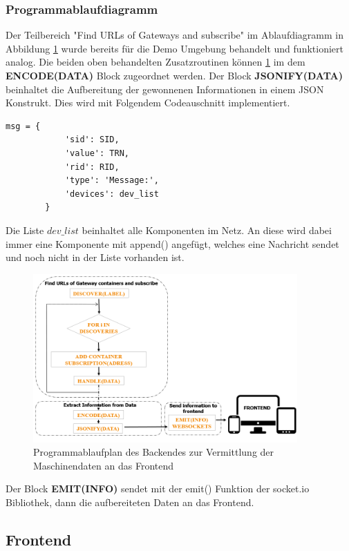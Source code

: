 \documentclass[
	12pt,								%
	DIV10,
	a4paper,         		%
	oneside,						%
	parskip=half,				%
	headings=normal,			%
	listof=totoc,					%
	bibliography=totoc,						%
	index=totoc,						%
	final								%
]{scrartcl}
\begin{document}
\subsubsection*{Programmablaufdiagramm}
Der Teilbereich "Find URLs of Gateways and subscribe" im Ablaufdiagramm in Abbildung \ref{diare} wurde bereits für die Demo Umgebung behandelt und funktioniert analog.
Die beiden oben behandelten Zusatzroutinen können \ref{diare} im dem \textbf{ENCODE(DATA)} Block zugeordnet werden. Der Block \textbf{JSONIFY(DATA)} beinhaltet die Aufbereitung der gewonnenen Informationen in einem JSON Konstrukt. Dies wird mit Folgendem Codeauschnitt implementiert.
\begin{lstlisting}[caption={Aufbereitung der gewonnenen Informationen im JSON Format}, label=hi]
		   msg = {
            'sid': SID,
            'value': TRN,
            'rid': RID,
            'type': 'Message:',
            'devices': dev_list
        }
\end{lstlisting}
Die Liste $dev\_list$ beinhaltet alle Komponenten im Netz. An diese wird dabei immer eine Komponente mit append() angefügt, welches eine Nachricht sendet und noch nicht in der Liste vorhanden ist.

\begin{figure}[H]
\centering
\includegraphics[width=0.9\textwidth]{backend}
\caption{Programmablaufplan des Backendes zur Vermittlung der Maschinendaten an das Frontend}
\label{diare}
\end{figure}
Der Block \textbf{EMIT(INFO)} sendet mit der emit() Funktion der socket.io Bibliothek, dann die aufbereiteten Daten an das Frontend. 
\newpage

\subsection{Frontend}
\end{document}

